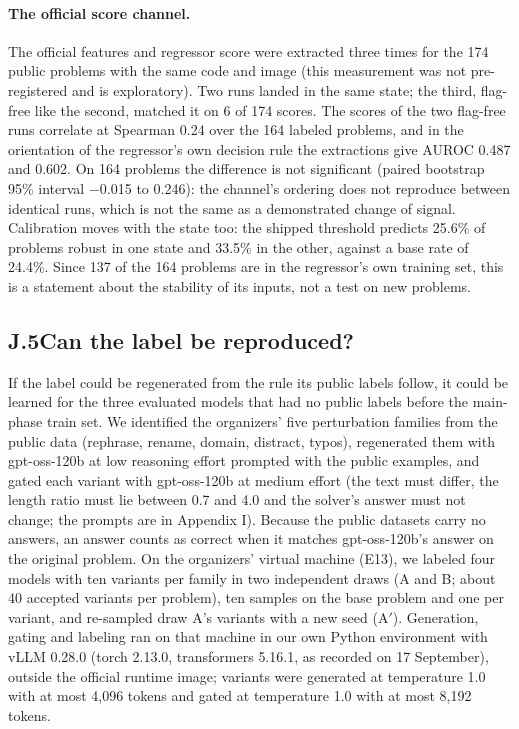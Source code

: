 \paragraph{The official score channel.}
The official features and regressor score were extracted three times for the 174 public problems with the same code and image (this measurement was not pre-registered and is exploratory). Two runs landed in the same state; the third, flag-free like the second, matched it on 6 of 174 scores. The scores of the two flag-free runs correlate at Spearman 0.24 over the 164 labeled problems, and in the orientation of the regressor's own decision rule the extractions give AUROC 0.487 and 0.602. On 164 problems the difference is not significant (paired bootstrap 95\% interval $-$0.015 to 0.246): the channel's ordering does not reproduce between identical runs, which is not the same as a demonstrated change of signal. Calibration moves with the state too: the shipped threshold predicts 25.6\% of problems robust in one state and 33.5\% in the other, against a base rate of 24.4\%. Since 137 of the 164 problems are in the regressor's own training set, this is a statement about the stability of its inputs, not a test on new problems.

\subsection*{J.5\quad Can the label be reproduced?}

If the label could be regenerated from the rule its public labels follow, it could be learned for the three evaluated models that had no public labels before the main-phase train set. We identified the organizers' five perturbation families from the public data (rephrase, rename, domain, distract, typos), regenerated them with gpt-oss-120b at low reasoning effort prompted with the public examples, and gated each variant with gpt-oss-120b at medium effort (the text must differ, the length ratio must lie between 0.7 and 4.0 and the solver's answer must not change; the prompts are in Appendix I). Because the public datasets carry no answers, an answer counts as correct when it matches gpt-oss-120b's answer on the original problem. On the organizers' virtual machine (E13), we labeled four models with ten variants per family in two independent draws (A and B; about 40 accepted variants per problem), ten samples on the base problem and one per variant, and re-sampled draw A's variants with a new seed (A$'$). Generation, gating and labeling ran on that machine in our own Python environment with vLLM 0.28.0 (torch 2.13.0, transformers 5.16.1, as recorded on 17 September), outside the official runtime image; variants were generated at temperature 1.0 with at most 4,096 tokens and gated at temperature 1.0 with at most 8,192 tokens.

